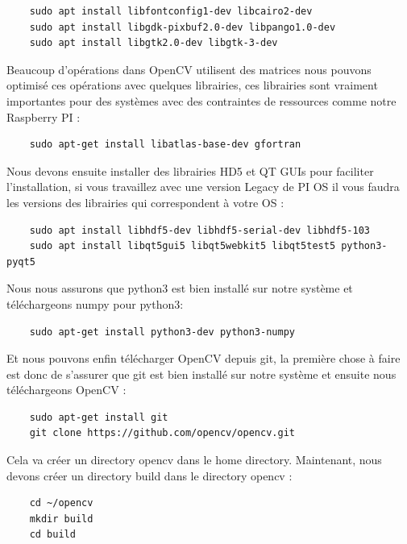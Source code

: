 \documentclass[
	a4paper,									%
	11pt,										%
	twoside,									%
	openright,									%
	notitlepage,									%
	parskip=half,								%
]{scrreprt}										%
\begin{document}
\begin{verbatim}
	sudo apt install libfontconfig1-dev libcairo2-dev
	sudo apt install libgdk-pixbuf2.0-dev libpango1.0-dev
	sudo apt install libgtk2.0-dev libgtk-3-dev
\end{verbatim}

\newpage
Beaucoup d'opérations dans OpenCV utilisent des matrices nous pouvons optimisé ces opérations avec quelques librairies, 
ces librairies sont vraiment importantes pour des systèmes avec des contraintes de ressources comme notre Raspberry PI : 
\begin{verbatim}
	sudo apt-get install libatlas-base-dev gfortran
\end{verbatim}

Nous devons ensuite installer des librairies HD5 et QT GUIs pour faciliter l'installation, 
si vous travaillez avec une version Legacy de PI OS il vous faudra les versions des librairies qui 
correspondent à votre OS : 

\begin{verbatim}
	sudo apt install libhdf5-dev libhdf5-serial-dev libhdf5-103
	sudo apt install libqt5gui5 libqt5webkit5 libqt5test5 python3-pyqt5
\end{verbatim}

Nous nous assurons que python3 est bien installé sur notre système et téléchargeons numpy pour python3: 

\begin{verbatim}
	sudo apt-get install python3-dev python3-numpy
\end{verbatim}

Et nous pouvons enfin télécharger OpenCV depuis git, la première chose à faire est donc de s'assurer 
que git est bien installé sur notre système et ensuite nous téléchargeons OpenCV : 

\begin{verbatim}
	sudo apt-get install git
	git clone https://github.com/opencv/opencv.git
\end{verbatim}

Cela va créer un directory opencv dans le home directory. Maintenant, nous devons créer un directory build 
dans le directory opencv : 

\begin{verbatim}
	cd ~/opencv
	mkdir build
	cd build
\end{verbatim}
\end{document}
